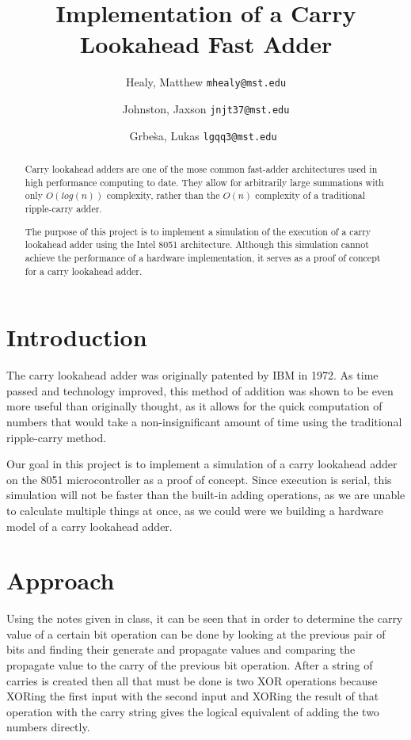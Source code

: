 \documentclass[journal]{IEEEtran}
\begin{document}
\title{Implementation of a Carry Lookahead Fast Adder}
\author{
	Healy, Matthew
	\texttt{mhealy@mst.edu}\\
	\and
	Johnston, Jaxson
	\texttt{jnjt37@mst.edu}\\
	\and
	Grbe\`sa, Lukas
	\texttt{lgqq3@mst.edu}\
}

\maketitle


\begin{abstract}
Carry lookahead adders are one of the mose common fast-adder architectures
used in high performance computing to date. They allow for arbitrarily large
summations with only $O(log(n))$ complexity, rather than the $O(n)$ complexity
of a traditional ripple-carry adder.

The purpose of this project is to implement a simulation of the execution
of a carry lookahead adder using the Intel 8051 architecture. Although this
simulation cannot achieve the performance of a hardware implementation, it
serves as a proof of concept for a carry lookahead adder.

\end{abstract}

\section{Introduction}\label{sec:intro}
The carry lookahead adder was originally patented by IBM\cite{patent} in 1972.
As time passed and technology improved, this method of addition was shown
to be even more useful than originally thought, as it allows for the quick
computation of numbers that would take a non-insignificant amount of time
using the traditional ripple-carry method.

Our goal in this project is to implement a simulation of a carry lookahead
adder on the 8051 microcontroller as a proof of concept. Since execution is
serial, this simulation will not be faster than the built-in adding operations,
as we are unable to calculate multiple things at once, as we could were we
building a hardware model of a carry lookahead adder.

\section{Approach}\label{sec:approach}
Using the notes given in class, it can be seen that in order to determine the
carry value of a certain bit operation can be done by looking at the previous
pair of bits and finding their generate and propagate values and comparing the
propagate value to the carry of the previous bit operation. After a string of
carries is created then all that must be done is two XOR operations because
XORing the first input with the second input and XORing the result of that
operation with the carry string gives the logical equivalent of adding the two
numbers directly.
\end{document}
